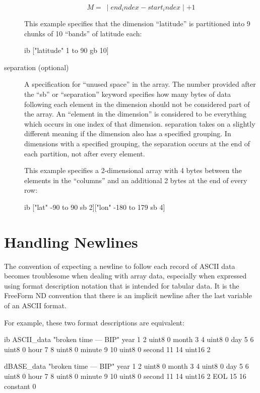\begin{description}
\begin{displaymath}
M =\ \mid end_index -  start_index\mid + 1
\end{displaymath}

This example specifies that the dimension ``latitude'' is partitioned
into 9 chunks of 10 ``bands'' of latitude each:

\begin{vcode}{ib}
["latitude" 1 to 90 gb 10] 
\end{vcode}

\item[separation (optional) ]
  
  A specification for ``unused space'' in the array. The number
  provided after the ``sb'' or ``separation'' keyword specifies how
  many bytes of data following each element in the dimension should
  not be considered part of the array. An ``element in the dimension''
  is considered to be everything which occurs in one index of that
  dimension. separation takes on a slightly different meaning if the
  dimension also has a specified grouping. In dimensions with a
  specified grouping, the separation occurs at the end of each
  partition, not after every element.
  
  This example specifies a 2-dimensional array with 4 bytes between
  the elements in the ``columns'' and an additional 2 bytes at the end
  of every row:


\begin{vcode}{ib}
["lat" -90 to 90 sb 2]["lon" -180 to 179 sb 4] 
\end{vcode}

\end{description}


\section{Handling Newlines}
\label{ff,newline}

The convention of expecting a newline to follow each record of ASCII
data becomes troublesome when dealing with array data, especially when
expressed using format description notation that is intended for
tabular data. It is the FreeForm ND convention that there is an
implicit newline after the last variable of an ASCII format.

For example, these two format descriptions are equivalent:  

\begin{vcode}{ib}
ASCII_data "broken time --- BIP"  
year 1 2 uint8 0 
month 3 4 uint8 0 
day 5 6 uint8 0 
hour 7 8 uint8 0 
minute 9 10 uint8 0 
second 11 14 uint16 2 

dBASE_data "broken time --- BIP" 
year 1 2 uint8 0 
month 3 4 uint8 0 
day 5 6 uint8 0 
hour 7 8 uint8 0 
minute 9 10 uint8 0 
second 11 14 uint16 2 
EOL 15 16 constant 0  
\end{vcode}

